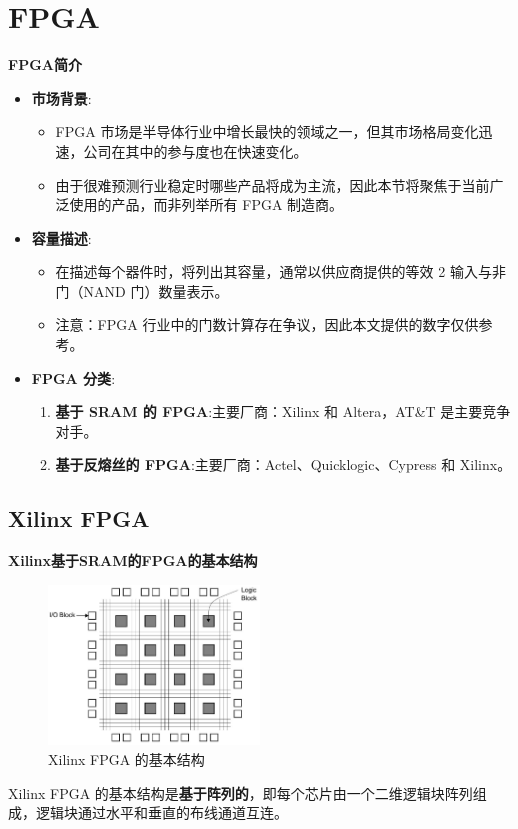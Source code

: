 \section{FPGA}

\begin{frame}{\textbf{FPGA简介}}
\label{fpga}
\begin{itemize}
\tightlist
\item
    \textbf{市场背景}:

    \begin{itemize}
    \tightlist
    \item
    FPGA
    市场是半导体行业中增长最快的领域之一，但其市场格局变化迅速，公司在其中的参与度也在快速变化。
    \item
    由于很难预测行业稳定时哪些产品将成为主流，因此本节将聚焦于当前广泛使用的产品，而非列举所有
    FPGA 制造商。
    \end{itemize}
\item
    \textbf{容量描述}:

    \begin{itemize}
    \tightlist
    \item
    在描述每个器件时，将列出其容量，通常以供应商提供的等效 2
    输入与非门（NAND 门）数量表示。
    \item
    注意：FPGA 行业中的门数计算存在争议，因此本文提供的数字仅供参考。
    \end{itemize}
\item
    \textbf{FPGA 分类}:

    \begin{enumerate}
    \tightlist
    \item
    \textbf{基于 SRAM 的 FPGA}:主要厂商：Xilinx 和 Altera，AT\&T 是主要竞争对手。
    \item
    \textbf{基于反熔丝的 FPGA}:主要厂商：Actel、Quicklogic、Cypress 和 Xilinx。
    \end{enumerate}
\end{itemize}
\end{frame}

\subsection{Xilinx FPGA}
\begin{frame}{\textbf{Xilinx基于SRAM的FPGA的基本结构}}
\begin{figure}
    \centering
    \includegraphics[width=0.5\textwidth]{img1/FPGA.jpeg}
    \caption{Xilinx FPGA 的基本结构}
\end{figure}
    Xilinx FPGA
    的基本结构是\textbf{基于阵列的}，即每个芯片由一个二维逻辑块阵列组成，逻辑块通过水平和垂直的布线通道互连。
\end{frame}


